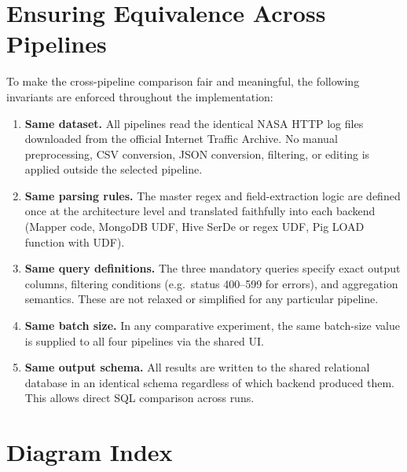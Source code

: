 \documentclass[11pt,a4paper]{article}
\begin{document}
\section{Ensuring Equivalence Across Pipelines}

To make the cross-pipeline comparison fair and meaningful, the following invariants are enforced throughout the implementation:

\begin{enumerate}
  \item \textbf{Same dataset.} All pipelines read the identical NASA HTTP log files downloaded from the official Internet Traffic Archive. No manual preprocessing, CSV conversion, JSON conversion, filtering, or editing is applied outside the selected pipeline.

  \item \textbf{Same parsing rules.} The master regex and field-extraction logic are defined once at the architecture level and translated faithfully into each backend (Mapper code, MongoDB UDF, Hive SerDe or regex UDF, Pig LOAD function with UDF).

  \item \textbf{Same query definitions.} The three mandatory queries specify exact output columns, filtering conditions (e.g.\ status 400--599 for errors), and aggregation semantics. These are not relaxed or simplified for any particular pipeline.

  \item \textbf{Same batch size.} In any comparative experiment, the same batch-size value is supplied to all four pipelines via the shared UI.

  \item \textbf{Same output schema.} All results are written to the shared relational database in an identical schema regardless of which backend produced them. This allows direct SQL comparison across runs.
\end{enumerate}

\section{Diagram Index}
\end{document}
